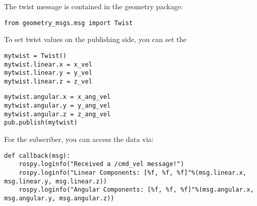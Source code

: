The twist message is contained in the geometry package:

\begin{verbatim}
from geometry_msgs.msg import Twist
\end{verbatim}

To set twist values on the publishing side, you can set the

\begin{verbatim}
mytwist = Twist()
mytwist.linear.x = x_vel
mytwist.linear.y = y_vel
mytwist.linear.z = z_vel
\end{verbatim}

\begin{verbatim}
mytwist.angular.x = x_ang_vel
mytwist.angular.y = y_ang_vel
mytwist.angular.z = z_ang_vel
pub.publish(mytwist)
\end{verbatim}

For the subscriber, you can access the data via:

\begin{verbatim}
def callback(msg):
    rospy.loginfo("Received a /cmd_vel message!")
    rospy.loginfo("Linear Components: [%f, %f, %f]"%(msg.linear.x, msg.linear.y, msg.linear.z))
    rospy.loginfo("Angular Components: [%f, %f, %f]"%(msg.angular.x, msg.angular.y, msg.angular.z))
\end{verbatim}
